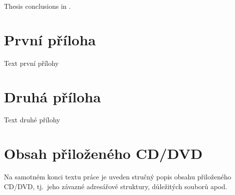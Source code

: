 \documentclass[
  field=inf,
  biblatex,
  glossaries,
  index
]{kidiplom}
\begin{document}
\begin{kiconclusions}[english]
Thesis conclusions in .
\end{kiconclusions}

\appendix

\section{První příloha}
Text první přílohy

\section{Druhá příloha}
Text druhé přílohy

\section{Obsah přiloženého CD/DVD} \label{sec:ObsahCD}

Na samotném konci textu práce je uveden stručný popis obsahu
přiloženého CD/DVD, tj.~jeho závazné adresářové struktury, důležitých
souborů apod.
\end{document}
